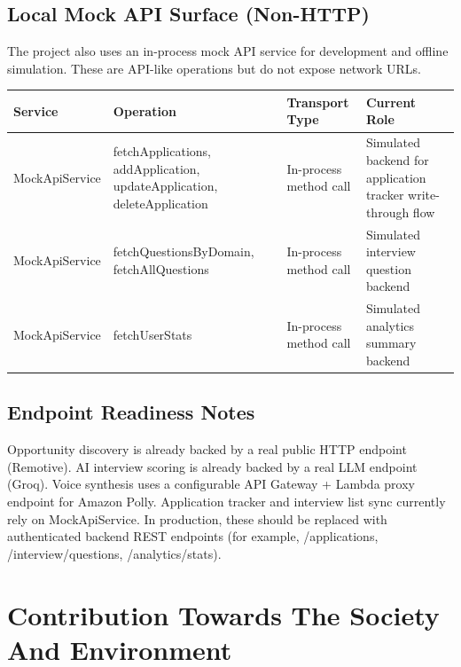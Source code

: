 \documentclass[conference]{IEEEtran}
\begin{document}
\subsection{Local Mock API Surface (Non-HTTP)}

The project also uses an in-process mock API service for development and offline simulation. These are API-like operations but do not expose network URLs.

\begin{table}[!tb]
\centering
\setlength{\tabcolsep}{4pt}
\normalsize
\begin{tabularx}{\textwidth}{|>{\RaggedRight\arraybackslash}X|>{\RaggedRight\arraybackslash}X|>{\RaggedRight\arraybackslash}X|>{\RaggedRight\arraybackslash}X|}
\hline
 \textbf{Service} & \textbf{Operation} & \textbf{Transport Type} & \textbf{Current Role} \\
\hline
 MockApiService & fetchApplications, addApplication, updateApplication, deleteApplication & In-process method call & Simulated backend for application tracker write-through flow \\
\hline
 MockApiService & fetchQuestionsByDomain, fetchAllQuestions & In-process method call & Simulated interview question backend \\
\hline
 MockApiService & fetchUserStats & In-process method call & Simulated analytics summary backend \\
\hline
\end{tabularx}
\end{table}

\subsection{Endpoint Readiness Notes}

Opportunity discovery is already backed by a real public HTTP endpoint (Remotive). AI interview scoring is already backed by a real LLM endpoint (Groq). Voice synthesis uses a configurable API Gateway + Lambda proxy endpoint for Amazon Polly. Application tracker and interview list sync currently rely on MockApiService. In production, these should be replaced with authenticated backend REST endpoints (for example, /applications, /interview/questions, /analytics/stats).

\section{Contribution Towards The Society And Environment}
\end{document}
